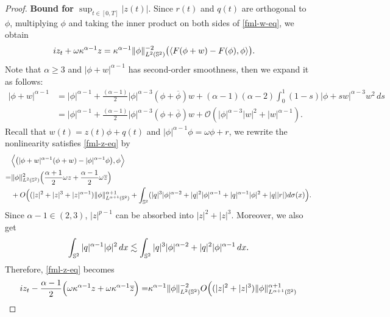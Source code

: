 \documentclass[11pt, reqno]{amsart}
\numberwithin{equation}{section}
\theoremstyle{definition}
\theoremstyle{remark}
\begin{document}
{\begin{proof}
\textbf{Bound for $\sup_{t\in[0,T]}|z(t)|$}. Since $r(t)$ and $q(t)$ are orthogonal to $\phi$,  multiplying $\phi$ and taking the inner product  on both sides of \eqref{fml-w-eq}, we obtain
\begin{equation}\label{fml-z-eq}
\begin{aligned}
iz_t+\omega\kappa^{\alpha-1}z &= \kappa^{\alpha-1}\|\phi\|^{-2}_{L^2(\Bbb S^2)} \big( \langle F(\phi+w)-F(\phi),\phi\rangle\big).
\end{aligned}
\end{equation}
Note that $\alpha\geq3$ and $|\phi+w|^{\alpha-1}$ has second-order smoothness, then we expand it as follows:
\begin{equation*}
\begin{aligned}
|\phi+w|^{\alpha-1} &= |\phi|^{\alpha-1} + \frac{(\alpha-1)}{2}|\phi|^{\alpha-3}(\phi+\overline{\phi})w + (\alpha-1)(\alpha-2)\int_0^1 (1-s)|\phi+sw|^{\alpha-3}w^2\, ds\\
&= |\phi|^{\alpha-1} + \frac{(\alpha-1)}{2}|\phi|^{\alpha-3}(\phi+\overline{\phi})w + \mathcal{O}(|\phi|^{\alpha-3}|w|^2 + |w|^{\alpha-1}).
\end{aligned}
\end{equation*}
Recall that $w(t) = z(t)\phi+q(t)$ and $|\phi|^{\alpha-1}\phi = \omega\phi+r$, we rewrite the nonlinearity satisfies \eqref{fml-z-eq} by
\begin{equation*}
\begin{aligned}
&\Big\langle \big(|\phi+w|^{\alpha-1}(\phi+w) - |\phi|^{\alpha-1}\phi \big),\phi\Big\rangle \\
=&\|\phi\|^2_{L^2(\Bbb S^2)}\Big( \frac{\alpha+1}{2}\omega z+\frac{\alpha-1}{2}\omega \overline{z} \Big) \\
&+ O\Big((|z|^2+|z|^3+|z|^{\alpha-1})\|\phi\|^{\alpha+1}_{L^{\alpha+1}(\Bbb S^2)} + \int_{\Bbb S^2}(|q|^3|\phi|^{\alpha-2}+|q|^2|\phi|^{\alpha-1}+|q|^{\alpha-1}|\phi|^2+|q||r|)d\sigma(x)\Big).
\end{aligned}
\end{equation*}
Since $\alpha-1\in (2,3)$, $|z|^{p-1}$ can be absorbed into $|z|^2+|z|^3$. Moreover, we also get 
\begin{equation*}
\int_{\Bbb S^2}|q|^{\alpha-1}|\phi|^2\, dx \lesssim \int_{\Bbb S^2}|q|^3|\phi|^{\alpha-2} + |q|^2|\phi|^{\alpha-1}\, dx.
\end{equation*}
Therefore, \eqref{fml-z-eq} becomes
\begin{equation*}
\begin{aligned}
iz_t-\frac{\alpha-1}{2}\Big(\omega\kappa^{\alpha-1}z+\omega\kappa^{\alpha-1}\overline{z}\Big) =& \kappa^{\alpha-1}\|\phi\|^{-2}_{L^2(\Bbb S^2)} O\Big((|z|^2+|z|^3)\|\phi\|^{\alpha+1}_{L^{\alpha+1}(\Bbb S^2)} \\

\end{aligned}
\end{equation*}
\end{proof}}
\end{document}
